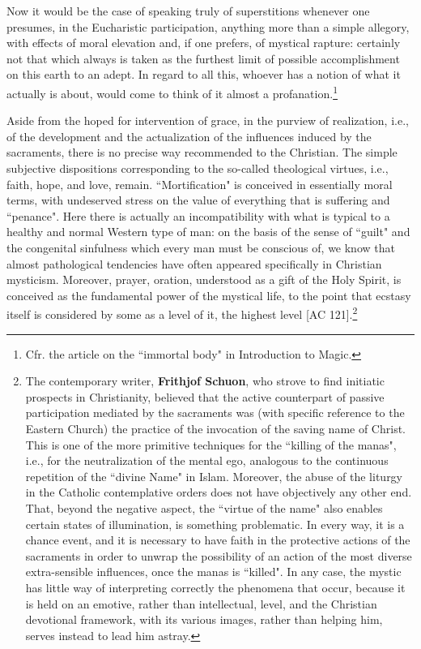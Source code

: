 Now it would be the case of speaking truly of superstitions whenever one presumes, in the Eucharistic participation, anything more than a simple allegory, with effects of moral elevation and, if one prefers, of mystical rapture: certainly not that which always is taken as the furthest limit of possible accomplishment on this earth to an adept. In regard to all this, whoever has a notion of what it actually is about, would come to think of it almost a profanation.\footnote{Cfr. the article on the ``immortal body" in Introduction to Magic.}

Aside from the hoped for intervention of grace, in the purview of realization, i.e., of the development and the actualization of the influences induced by the sacraments, there is no precise way recommended to the Christian. The simple subjective dispositions corresponding to the so-called theological virtues, i.e., faith, hope, and love, remain. ``Mortification" is conceived in essentially moral terms, with undeserved stress on the value of everything that is suffering and ``penance". Here there is actually an incompatibility with what is typical to a healthy and normal Western type of man: on the basis of the sense of ``guilt" and the congenital sinfulness which every man must be conscious of, we know that almost pathological tendencies have often appeared specifically in Christian mysticism. Moreover, prayer, oration, understood as a gift of the Holy Spirit, is conceived as the fundamental power of the mystical life, to the point that ecstasy itself is considered by some as a level of it, the highest level [AC 121].\footnote{The contemporary writer, \textbf{Frithjof Schuon}, who strove to find initiatic prospects in Christianity, believed that the active counterpart of passive participation mediated by the sacraments was (with specific reference to the Eastern Church) the practice of the invocation of the saving name of Christ. This is one of the more primitive techniques for the ``killing of the manas", i.e., for the neutralization of the mental ego, analogous to the continuous repetition of the ``divine Name" in Islam. Moreover, the abuse of the liturgy in the Catholic contemplative orders does not have objectively any other end. That, beyond the negative aspect, the ``virtue of the name" also enables certain states of illumination, is something problematic. In every way, it is a chance event, and it is necessary to have faith in the protective actions of the sacraments in order to unwrap the possibility of an action of the most diverse extra-sensible influences, once the manas is ``killed". In any case, the mystic has little way of interpreting correctly the phenomena that occur, because it is held on an emotive, rather than intellectual, level, and the Christian devotional framework, with its various images, rather than helping him, serves instead to lead him astray.}


